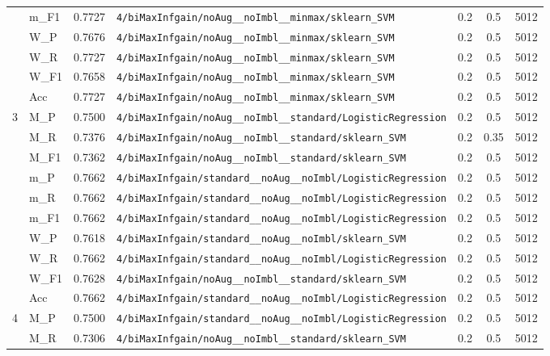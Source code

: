 \begin{table}[htbp]
\begin{tabular}{|c|l|c|>{\ttfamily\footnotesize}p{7.2cm}|c|c|c|}
 & m\_F1 & 0.7727 & \texttt{4/biMaxInfgain/noAug\_\_noImbl\_\_minmax/sklearn\_SVM} & 0.2 & 0.5  & 5012 \\ 
 & W\_P & 0.7676 & \texttt{4/biMaxInfgain/noAug\_\_noImbl\_\_minmax/sklearn\_SVM} & 0.2 & 0.5  & 5012 \\ 
 & W\_R & 0.7727 & \texttt{4/biMaxInfgain/noAug\_\_noImbl\_\_minmax/sklearn\_SVM} & 0.2 & 0.5  & 5012 \\ 
 & W\_F1 & 0.7658 & \texttt{4/biMaxInfgain/noAug\_\_noImbl\_\_minmax/sklearn\_SVM} & 0.2 & 0.5  & 5012 \\ 
 & Acc & 0.7727 & \texttt{4/biMaxInfgain/noAug\_\_noImbl\_\_minmax/sklearn\_SVM} & 0.2 & 0.5  & 5012 \\ 
\hline
\multirow{10}{*}{3} & M\_P & 0.7500 & \texttt{4/biMaxInfgain/noAug\_\_noImbl\_\_standard/LogisticRegression} & 0.2 & 0.5  & 5012 \\ 
 & M\_R & 0.7376 & \texttt{4/biMaxInfgain/noAug\_\_noImbl\_\_standard/sklearn\_SVM} & 0.2 & 0.35  & 5012 \\ 
 & M\_F1 & 0.7362 & \texttt{4/biMaxInfgain/noAug\_\_noImbl\_\_standard/sklearn\_SVM} & 0.2 & 0.5  & 5012 \\ 
 & m\_P & 0.7662 & \texttt{4/biMaxInfgain/standard\_\_noAug\_\_noImbl/LogisticRegression} & 0.2 & 0.5  & 5012 \\ 
 & m\_R & 0.7662 & \texttt{4/biMaxInfgain/standard\_\_noAug\_\_noImbl/LogisticRegression} & 0.2 & 0.5  & 5012 \\ 
 & m\_F1 & 0.7662 & \texttt{4/biMaxInfgain/standard\_\_noAug\_\_noImbl/LogisticRegression} & 0.2 & 0.5  & 5012 \\ 
 & W\_P & 0.7618 & \texttt{4/biMaxInfgain/standard\_\_noAug\_\_noImbl/sklearn\_SVM} & 0.2 & 0.5  & 5012 \\ 
 & W\_R & 0.7662 & \texttt{4/biMaxInfgain/standard\_\_noAug\_\_noImbl/LogisticRegression} & 0.2 & 0.5  & 5012 \\ 
 & W\_F1 & 0.7628 & \texttt{4/biMaxInfgain/noAug\_\_noImbl\_\_standard/sklearn\_SVM} & 0.2 & 0.5  & 5012 \\ 
 & Acc & 0.7662 & \texttt{4/biMaxInfgain/standard\_\_noAug\_\_noImbl/LogisticRegression} & 0.2 & 0.5  & 5012 \\ 
\hline
\multirow{10}{*}{4} & M\_P & 0.7500 & \texttt{4/biMaxInfgain/standard\_\_noAug\_\_noImbl/LogisticRegression} & 0.2 & 0.5  & 5012 \\ 
 & M\_R & 0.7306 & \texttt{4/biMaxInfgain/noAug\_\_noImbl\_\_standard/sklearn\_SVM} & 0.2 & 0.5  & 5012 \\ 

\end{tabular}
\end{table}

